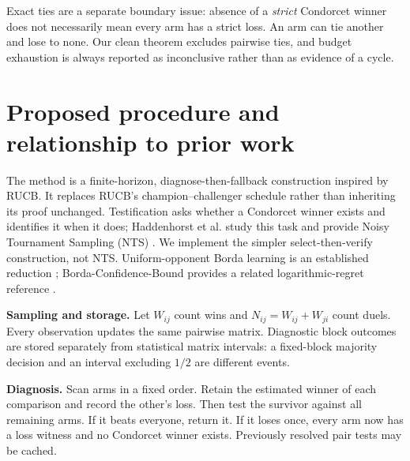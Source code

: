 \documentclass[11pt,a4paper]{article}
\begin{document}
Exact ties are a separate boundary issue: absence of a \emph{strict} Condorcet winner does not necessarily mean every arm has a strict loss. An arm can tie another and lose to none. Our clean theorem excludes pairwise ties, and budget exhaustion is always reported as inconclusive rather than as evidence of a cycle.

\section{Proposed procedure and relationship to prior work}

The method is a finite-horizon, diagnose-then-fallback construction inspired by RUCB. It replaces RUCB's champion--challenger schedule rather than inheriting its proof unchanged. Testification asks whether a Condorcet winner exists and identifies it when it does; Haddenhorst et al. study this task and provide Noisy Tournament Sampling (NTS) \cite{test}. We implement the simpler select-then-verify construction, not NTS. Uniform-opponent Borda learning is an established reduction \cite{sparse}; Borda-Confidence-Bound provides a related logarithmic-regret reference \cite{bcb}.

\begin{center}
\end{center}
\textbf{Sampling and storage.} Let $W_{ij}$ count wins and $N_{ij}=W_{ij}+W_{ji}$ count duels. Every observation updates the same pairwise matrix. Diagnostic block outcomes are stored separately from statistical matrix intervals: a fixed-block majority decision and an interval excluding $1/2$ are different events.

\textbf{Diagnosis.} Scan arms in a fixed order. Retain the estimated winner of each comparison and record the other's loss. Then test the survivor against all remaining arms. If it beats everyone, return it. If it loses once, every arm now has a loss witness and no Condorcet winner exists. Previously resolved pair tests may be cached.
\end{document}
